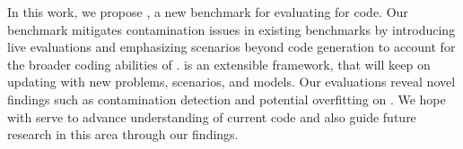In this work, we propose \livecodebench{}, a new benchmark for evaluating \llms{} for code.
Our benchmark mitigates contamination issues in existing benchmarks by introducing live evaluations and emphasizing scenarios beyond code generation to account for the broader coding abilities of \llms{}.
\livecodebench{} is an extensible framework, that will keep on updating with new problems, scenarios, and models.
Our evaluations reveal novel findings such as contamination detection and potential overfitting on \humaneval{}.
We hope \livecodebench{} with serve to advance understanding of current code \llms{} and also guide future research in this area through our findings.